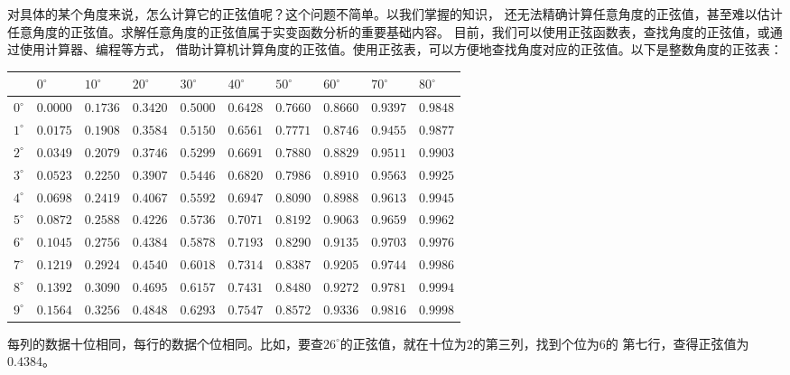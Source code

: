 \documentclass[12pt,UTF8]{ctexbook}
\begin{document}
对具体的某个角度来说，怎么计算它的正弦值呢？这个问题不简单。以我们掌握的知识，
还无法精确计算任意角度的正弦值，甚至难以估计任意角度的正弦值。求解任意角度的正弦值属于实变函数分析的重要基础内容。
目前，我们可以使用正弦函数表，查找角度的正弦值，或通过使用计算器、编程等方式，
借助计算机计算角度的正弦值。使用正弦表，可以方便地查找角度对应的正弦值。以下是整数角度的正弦表：

\begin{center}
    \begin{tabular}{| p{1em}<{\centering} | p{2.4em}<{\centering} | p{2.4em}<{\centering} | p{2.4em}<{\centering} | p{2.4em}<{\centering} | p{2.4em}<{\centering} | p{2.4em}<{\centering} | p{2.4em}<{\centering} | p{2.4em}<{\centering} | p{2.4em}<{\centering} |}
        \hline
                  & $0^\circ$& $10^\circ$ & $20^\circ$ & $30^\circ$ & $40^\circ$ & $50^\circ$ & $60^\circ$ & $70^\circ$ & $80^\circ$ \\ [0.5ex] 
        \hline
        $0^\circ$ & $0.0000$ &  $0.1736$  &  $0.3420$  &  $0.5000$  &  $0.6428$  &  $0.7660$  &  $0.8660$  &  $0.9397$  &  $0.9848$  \\
        \hline
        $1^\circ$ & $0.0175$ &  $0.1908$  &  $0.3584$  &  $0.5150$  &  $0.6561$  &  $0.7771$  &  $0.8746$  &  $0.9455$  &  $0.9877$  \\
        \hline
        $2^\circ$ & $0.0349$ &  $0.2079$  &  $0.3746$  &  $0.5299$  &  $0.6691$  &  $0.7880$  &  $0.8829$  &  $0.9511$  &  $0.9903$  \\
        \hline
        $3^\circ$ & $0.0523$ &  $0.2250$  &  $0.3907$  &  $0.5446$  &  $0.6820$  &  $0.7986$  &  $0.8910$  &  $0.9563$  &  $0.9925$  \\
        \hline
        $4^\circ$ & $0.0698$ &  $0.2419$  &  $0.4067$  &  $0.5592$  &  $0.6947$  &  $0.8090$  &  $0.8988$  &  $0.9613$  &  $0.9945$  \\
        \hline
        $5^\circ$ & $0.0872$ &  $0.2588$  &  $0.4226$  &  $0.5736$  &  $0.7071$  &  $0.8192$  &  $0.9063$  &  $0.9659$  &  $0.9962$  \\
        \hline
        $6^\circ$ & $0.1045$ &  $0.2756$  &  $0.4384$  &  $0.5878$  &  $0.7193$  &  $0.8290$  &  $0.9135$  &  $0.9703$  &  $0.9976$  \\
        \hline
        $7^\circ$ & $0.1219$ &  $0.2924$  &  $0.4540$  &  $0.6018$  &  $0.7314$  &  $0.8387$  &  $0.9205$  &  $0.9744$  &  $0.9986$  \\
        \hline
        $8^\circ$ & $0.1392$ &  $0.3090$  &  $0.4695$  &  $0.6157$  &  $0.7431$  &  $0.8480$  &  $0.9272$  &  $0.9781$  &  $0.9994$  \\
        \hline
        $9^\circ$ & $0.1564$ &  $0.3256$  &  $0.4848$  &  $0.6293$  &  $0.7547$  &  $0.8572$  &  $0.9336$  &  $0.9816$  &  $0.9998$  \\
        \hline
    \end{tabular}
\end{center}
每列的数据十位相同，每行的数据个位相同。比如，要查$26^\circ$的正弦值，就在十位为$2$的第三列，找到个位为$6$的
第七行，查得正弦值为$0.4384$。
\end{document}
